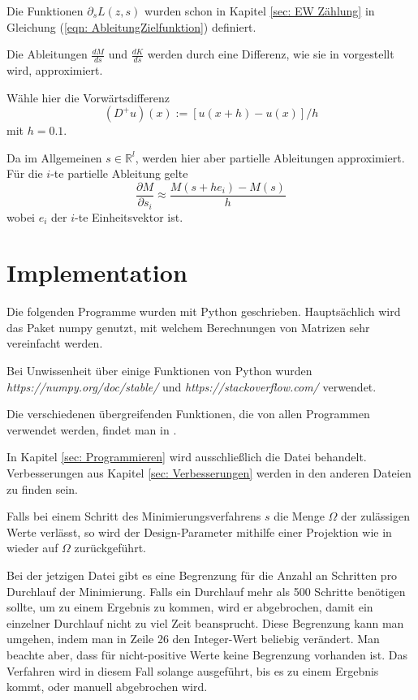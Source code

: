 \documentclass[a4paper,12pt]{report}
\newcommand{\R}{\mathbb R}
\newcommand{\zitat}[1]{\glqq #1\grqq}
\newcommand{\1}{\mathds{1}}
\theoremstyle{plain} %
\theoremstyle{definition} %
\theoremstyle{remark}
\begin{document}
            Die Funktionen $\partial_s L(z, s)$ wurden schon in Kapitel \ref{sec: EW Zählung} in Gleichung (\ref{eqn: AbleitungZielfunktion}) definiert.

            Die Ableitungen $\frac{d M}{d s}$ und $\frac{d K}{d s}$ werden durch eine Differenz, wie sie in \cite[S. 16 f.]{numerikGrossmann} vorgestellt wird, approximiert.

            Wähle hier die Vorwärtsdifferenz
            \begin{equation}
                  \label{def: DiffVerfahren}
                  (D^+u)(x):=[u(x+h)-u(x)]/h
            \end{equation}
            mit $h=0.1$.

            Da im Allgemeinen $s\in \R^l$, werden hier aber partielle Ableitungen approximiert.
            Für die $i$-te partielle Ableitung gelte
            $$\frac{\partial M}{\partial s_i}\approx \frac{M(s+h e_i)-M(s)}{h}$$
            wobei $e_i$ der $i$-te Einheitsvektor ist.
 
      \section{Implementation}
            Die folgenden Programme wurden mit Python geschrieben. Hauptsächlich wird das Paket \zitat{numpy} genutzt,
            mit welchem Berechnungen von Matrizen sehr vereinfacht werden.

            Bei Unwissenheit über einige Funktionen von Python wurden \textit{https://numpy.org/doc/stable/} und \textit{https://stackoverflow.com/} verwendet.

            Die verschiedenen übergreifenden Funktionen, die von allen Programmen verwendet werden, findet man in \cite[\textit{./Programmierung/Funktionen.py}]{github}.

            In Kapitel \ref{sec: Programmieren} wird ausschließlich die Datei \cite[\textit{./Programmierung/erste Implementierung.py}]{github} behandelt.
            Verbesserungen aus Kapitel \ref{sec: Verbesserungen} werden in den anderen Dateien zu finden sein.
            
            Falls bei einem Schritt des Minimierungsverfahrens $s$ die Menge $\Omega$ der zulässigen Werte verlässt,
            so wird der Design-Parameter mithilfe einer Projektion wie in \cite[S. 314]{optimierungJarreProjektion} wieder auf $\Omega$ zurückgeführt.
            
            Bei der jetzigen Datei gibt es eine Begrenzung für die Anzahl an Schritten pro Durchlauf der Minimierung.
            Falls ein Durchlauf mehr als 500 Schritte benötigen sollte, um zu einem Ergebnis zu kommen, wird er abgebrochen, damit ein einzelner Durchlauf nicht zu viel Zeit beansprucht.
            Diese Begrenzung kann man umgehen, indem man in Zeile 26 den Integer-Wert beliebig verändert. Man beachte aber, dass für nicht-positive Werte keine Begrenzung vorhanden ist.
            Das Verfahren wird in diesem Fall solange ausgeführt, bis es zu einem Ergebnis kommt, oder manuell abgebrochen wird.
\end{document}
